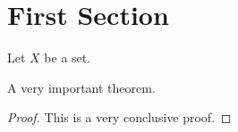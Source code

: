 \documentclass[english]{../uni-def}
\begin{document}
\maketitle

\tableofcontents
\newpage

\section{First Section}
\begin{defi} 
Let $X$ be a set.
\end{defi}

\begin{theorem}
A very important theorem.
\end{theorem}
\begin{proof}
    This is a very conclusive proof.
\end{proof}
\end{document}
